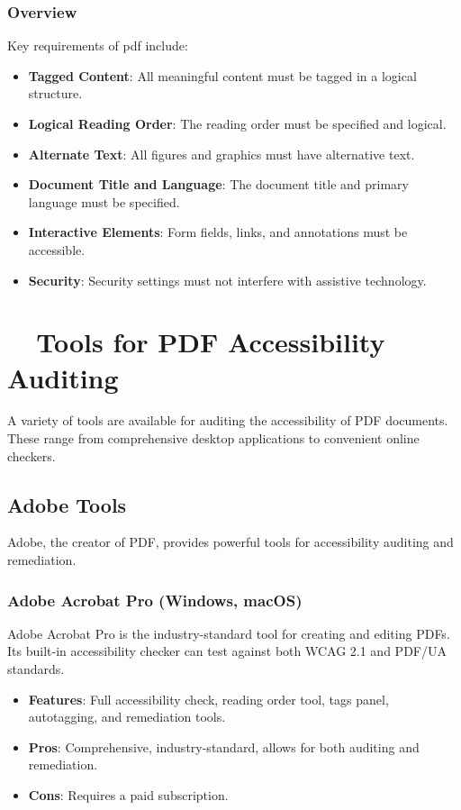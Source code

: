 \subsubsection{Overview}
\label{ssubsec:pdf-ua-overview}
Key requirements of \gls{pdf} include:
\begin{itemize}
	\item \textbf{Tagged Content}: All meaningful content must be tagged in a logical structure.
	\item \textbf{Logical Reading Order}: The reading order must be specified and logical.
	\item \textbf{Alternate Text}: All figures and graphics must have alternative text.
	\item \textbf{Document Title and Language}: The document title and primary language must be specified.
	\item \textbf{Interactive Elements}: Form fields, links, and annotations must be accessible.
	\item \textbf{Security}: Security settings must not interfere with assistive technology.
\end{itemize}

\section{~~Tools for PDF Accessibility Auditing}
\label{sec:pdf-auditing-tools}
A variety of tools are available for auditing the accessibility of PDF documents. These range from comprehensive desktop  applications to convenient online  checkers.

\subsection{Adobe Tools}
\label{subsec:adobe-tools}
Adobe, the creator of PDF, provides powerful tools for accessibility auditing and remediation.

\subsubsection{Adobe Acrobat Pro (Windows, macOS)}
\label{ssubsec:adobe-acrobat-pro}
Adobe Acrobat Pro is the industry-standard tool for creating and editing PDFs. Its built-in accessibility checker can test against both WCAG 2.1 and PDF/UA standards.
\begin{itemize}
	\item \textbf{Features}: Full accessibility check, reading order tool, tags panel, autotagging, and remediation tools.
	\item \textbf{Pros}: Comprehensive, industry-standard, allows for both auditing and remediation.
	\item \textbf{Cons}: Requires a paid subscription.
\end{itemize}

